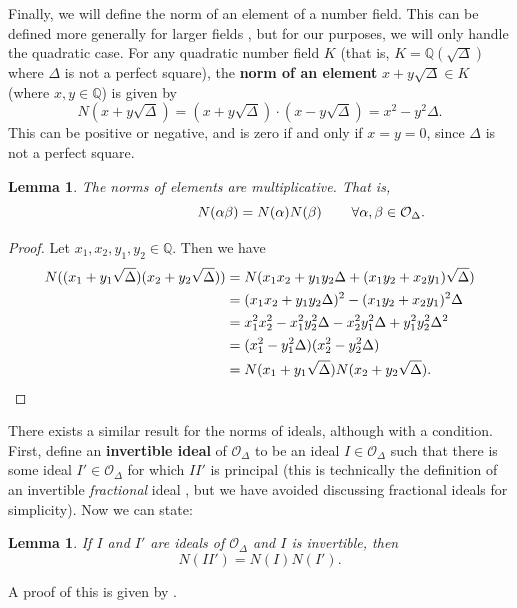 \documentclass[honours,12pt]{unswthesis}
\newcommand{\Q}{\mathbb{Q}} %
\newcommand{\order}{\mathcal{O}} %
\newcommand{\rnote}[1]{\rlap{\hspace{0.75cm}$#1$}}
\newtheorem{lemma}[theorem]{Lemma}
\numberwithin{equation}{section}
\begin{document}
Finally, we will define the norm of an element of a number field.
This can be defined more generally for larger fields \cite[\S\,3.2]{jarvis}, but for our purposes, we will only handle the quadratic case.
For any quadratic number field $K$ (that is, $K = \Q(\sqrt{\Delta})$ where $\Delta$ is not a perfect square), the \textbf{norm of an element} $x + y\sqrt\Delta \in K$ (where $x, y \in \Q$) is given by \cite[\S\,6.2]{buell}
$$N(x + y\sqrt\Delta) = (x + y\sqrt\Delta) \cdot (x - y\sqrt\Delta) = x^2 - y^2\Delta.$$
This can be positive or negative, and is zero if and only if $x = y = 0$, since $\Delta$ is not a perfect square.

\hspace{2mm}
\begin{lemma}
    The norms of elements are multiplicative.
    That is,
    $$N(\alpha \beta) = N(\alpha)N(\beta) \rnote{\forall \alpha, \beta \in \order_\Delta.}$$
\end{lemma}
\begin{proof}
    Let $x_1, x_2, y_1, y_2 \in \Q$.
    Then we have
    \begin{align*}
        N((x_1 + y_1\sqrt\Delta)(x_2 + y_2\sqrt\Delta)) &= N(x_1x_2 + y_1y_2\Delta + (x_1y_2 + x_2y_1)\sqrt\Delta) \\
        &= (x_1x_2 + y_1y_2\Delta)^2 - (x_1y_2 + x_2y_1)^2 \Delta \\
        &= x_1^2 x_2^2 - x_1^2 y_2^2 \Delta - x_2^2 y_1^2 \Delta + y_1^2 y_2^2 \Delta^2 \\
        &= (x_1^2 - y_1^2\Delta)(x_2^2 - y_2^2\Delta) \\
        &= N(x_1 + y_1\sqrt\Delta)N(x_2 + y_2\sqrt\Delta). \qedhere
    \end{align*}
\end{proof}

\noindent
There exists a similar result for the norms of ideals, although with a condition.
First, define an \textbf{invertible ideal} of $\order_\Delta$ to be an ideal $I \in \order_\Delta$ such that there is some ideal $I' \in \order_\Delta$ for which $II'$ is principal 
(this is technically the definition of an invertible \emph{fractional} ideal \cite[Prop.\,8.4.11]{buchmann}, but we have avoided discussing fractional ideals for simplicity).
Now we can state:

\vspace{2mm}
\begin{lemma} \label{invertible-norm-multiplicative}
    If $I$ and $I'$ are ideals of $\order_\Delta$ and $I$ is invertible, then
    $$N(II') = N(I)N(I').$$
\end{lemma}
\noindent
A proof of this is given by \cite[Prop.\,4.6.8]{cohen}.
\end{document}
